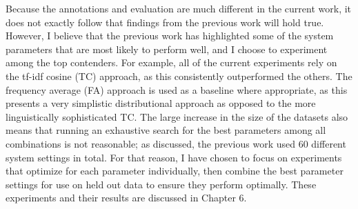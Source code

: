 Because the annotations and evaluation are much different in the current work, it does not exactly follow that findings from the previous work will hold true. However, I believe that the previous work has highlighted some of the system parameters that are most likely to perform well, and I choose to experiment among the top contenders. For example, all of the current experiments rely on the tf-idf cosine (TC) approach, as this consistently outperformed the others. The frequency average (FA) approach is used  as a baseline where appropriate, as this presents a very simplistic distributional approach as opposed to the more linguistically sophisticated TC. The large increase in the size of the datasets also means that running an exhaustive search for the best parameters among all combinations is not reasonable; as discussed, the previous work used 60 different system settings in total. For that reason, I have chosen to focus on experiments that optimize for each parameter individually, then combine the best parameter settings for use on held out data to ensure they perform optimally. These experiments and their results are discussed in Chapter 6.

%
